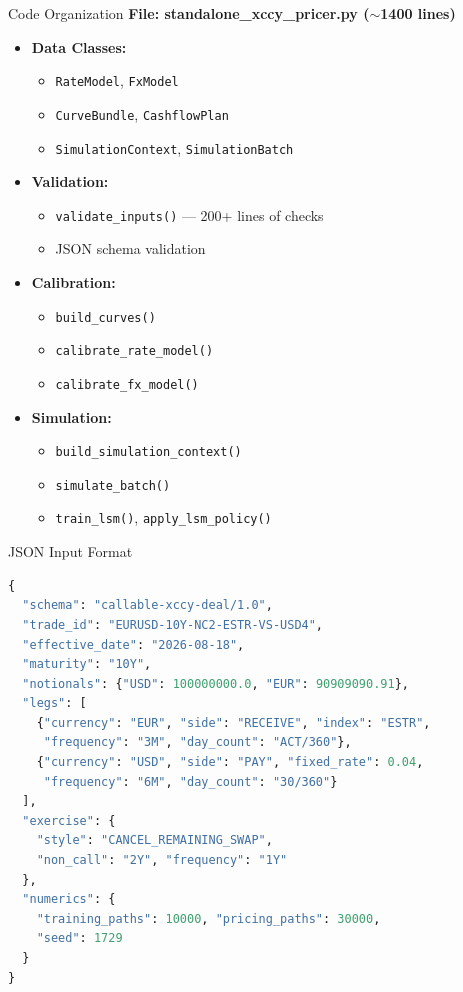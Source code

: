 \documentclass[aspectratio=169,11pt]{beamer}
\begin{document}
\begin{frame}{Code Organization}
\textbf{File: standalone\_xccy\_pricer.py ($\sim$1400 lines)}

\begin{itemize}
    \item \textbf{Data Classes:}
    \begin{itemize}
        \item \texttt{RateModel}, \texttt{FxModel}
        \item \texttt{CurveBundle}, \texttt{CashflowPlan}
        \item \texttt{SimulationContext}, \texttt{SimulationBatch}
    \end{itemize}

    \item \textbf{Validation:}
    \begin{itemize}
        \item \texttt{validate\_inputs()} --- 200+ lines of checks
        \item JSON schema validation
    \end{itemize}

    \item \textbf{Calibration:}
    \begin{itemize}
        \item \texttt{build\_curves()}
        \item \texttt{calibrate\_rate\_model()}
        \item \texttt{calibrate\_fx\_model()}
    \end{itemize}

    \item \textbf{Simulation:}
    \begin{itemize}
        \item \texttt{build\_simulation\_context()}
        \item \texttt{simulate\_batch()}
        \item \texttt{train\_lsm()}, \texttt{apply\_lsm\_policy()}
    \end{itemize}
\end{itemize}
\end{frame}

\begin{frame}[fragile]{JSON Input Format}
\begin{lstlisting}[language=Python,basicstyle=\ttfamily\tiny]
{
  "schema": "callable-xccy-deal/1.0",
  "trade_id": "EURUSD-10Y-NC2-ESTR-VS-USD4",
  "effective_date": "2026-08-18",
  "maturity": "10Y",
  "notionals": {"USD": 100000000.0, "EUR": 90909090.91},
  "legs": [
    {"currency": "EUR", "side": "RECEIVE", "index": "ESTR",
     "frequency": "3M", "day_count": "ACT/360"},
    {"currency": "USD", "side": "PAY", "fixed_rate": 0.04,
     "frequency": "6M", "day_count": "30/360"}
  ],
  "exercise": {
    "style": "CANCEL_REMAINING_SWAP",
    "non_call": "2Y", "frequency": "1Y"
  },
  "numerics": {
    "training_paths": 10000, "pricing_paths": 30000,
    "seed": 1729
  }
}
\end{lstlisting}
\end{frame}
\end{document}
